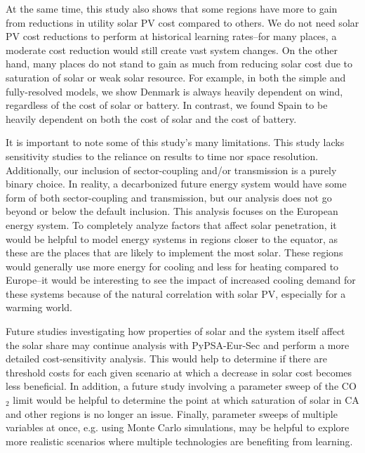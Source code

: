 \documentclass[lettersize,journal]{IEEEtran}
\begin{document}
At the same time, this study also shows that some regions have more to gain from reductions in utility solar PV cost compared to others. We do not need solar PV cost reductions to perform at historical learning rates--for many places, a moderate cost reduction would still create vast system changes. On the other hand, many places do not stand to gain as much from reducing solar cost due to saturation of solar or weak solar resource. For example, in both the simple and fully-resolved models, we show Denmark is always heavily dependent on wind, regardless of the cost of solar or battery. In contrast, we found Spain to be heavily dependent on both the cost of solar and the cost of battery.

It is important to note some of this study's many limitations. This study lacks sensitivity studies to the reliance on results to time nor space resolution. Additionally, our inclusion of sector-coupling and/or transmission is a purely binary choice. In reality, a decarbonized future energy system would have some form of both sector-coupling and transmission, but our analysis does not go beyond or below the default inclusion. This analysis focuses on the European energy system. To completely analyze factors that affect solar penetration, it would be helpful to model energy systems in regions closer to the equator, as these are the places that are likely to implement the most solar. These regions would generally use more energy for cooling and less for heating compared to Europe--it would be interesting to see the impact of increased cooling demand for these systems because of the natural correlation with solar PV, especially for a warming world.\cite{laine_meeting_2019, zhu_impact_2020}

Future studies investigating how properties of solar and the system itself affect the solar share may continue analysis with PyPSA-Eur-Sec and perform a more detailed cost-sensitivity analysis. This would help to determine if there are threshold costs for each given scenario at which a decrease in solar cost becomes less beneficial. In addition, a future study involving a parameter sweep of the CO$_2$ limit would be helpful to determine the point at which saturation of solar in CA and other regions is no longer an issue. Finally, parameter sweeps of multiple variables at once, e.g. using Monte Carlo simulations, may be helpful to explore more realistic scenarios where multiple technologies are benefiting from learning.
\end{document}
